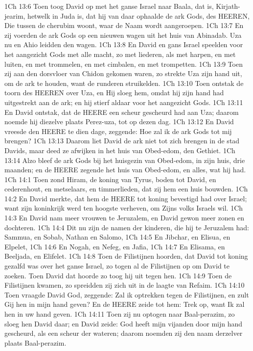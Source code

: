 1Ch 13:6  Toen toog David op met het ganse Israel naar Baala, dat is, Kirjath-jearim, hetwelk in Juda is, dat hij van daar ophaalde de ark Gods, des HEEREN, Die tussen de cherubim woont, waar de Naam wordt aangeroepen.
1Ch 13:7  En zij voerden de ark Gods op een nieuwen wagen uit het huis van Abinadab. Uza nu en Ahio leidden den wagen.
1Ch 13:8  En David en gans Israel speelden voor het aangezicht Gods met alle macht, zo met liederen, als met harpen, en met luiten, en met trommelen, en met cimbalen, en met trompetten.
1Ch 13:9  Toen zij aan den dorsvloer van Chidon gekomen waren, zo strekte Uza zijn hand uit, om de ark te houden, want de runderen struikelden.
1Ch 13:10  Toen ontstak de toorn des HEEREN over Uza, en Hij sloeg hem, omdat hij zijn hand had uitgestrekt aan de ark; en hij stierf aldaar voor het aangezicht Gods.
1Ch 13:11  En David ontstak, dat de HEERE een scheur gescheurd had aan Uza; daarom noemde hij diezelve plaats Perez-uza, tot op dezen dag.
1Ch 13:12  En David vreesde den HEERE te dien dage, zeggende: Hoe zal ik de ark Gods tot mij brengen?
1Ch 13:13  Daarom liet David de ark niet tot zich brengen in de stad Davids, maar deed ze afwijken in het huis van Obed-edom, den Gethiet.
1Ch 13:14  Alzo bleef de ark Gods bij het huisgezin van Obed-edom, in zijn huis, drie maanden; en de HEERE zegende het huis van Obed-edom, en alles, wat hij had.
1Ch 14:1  Toen zond Hiram, de koning van Tyrus, boden tot David, en cederenhout, en metselaars, en timmerlieden, dat zij hem een huis bouwden.
1Ch 14:2  En David merkte, dat hem de HEERE tot koning bevestigd had over Israel; want zijn koninkrijk werd ten hoogste verheven, om Zijns volks Israels wil.
1Ch 14:3  En David nam meer vrouwen te Jeruzalem, en David gewon meer zonen en dochteren.
1Ch 14:4  Dit nu zijn de namen der kinderen, die hij te Jeruzalem had: Sammua, en Sobab, Nathan en Salomo,
1Ch 14:5  En Jibchar, en Elisua, en Elpelet,
1Ch 14:6  En Nogah, en Nefeg, en Jafia,
1Ch 14:7  En Elisama, en Beeljada, en Elifelet.
1Ch 14:8  Toen de Filistijnen hoorden, dat David tot koning gezalfd was over het ganse Israel, zo togen al de Filistijnen op om David te zoeken. Toen David dat hoorde zo toog hij uit tegen hen.
1Ch 14:9  Toen de Filistijnen kwamen, zo spreidden zij zich uit in de laagte van Refaim.
1Ch 14:10  Toen vraagde David God, zeggende: Zal ik optrekken tegen de Filistijnen, en zult Gij hen in mijn hand geven? En de HEERE zeide tot hem: Trek op, want Ik zal hen in uw hand geven.
1Ch 14:11  Toen zij nu optogen naar Baal-perazim, zo sloeg hen David daar; en David zeide: God heeft mijn vijanden door mijn hand gescheurd, als een scheur der wateren; daarom noemden zij den naam derzelver plaats Baal-perazim.
